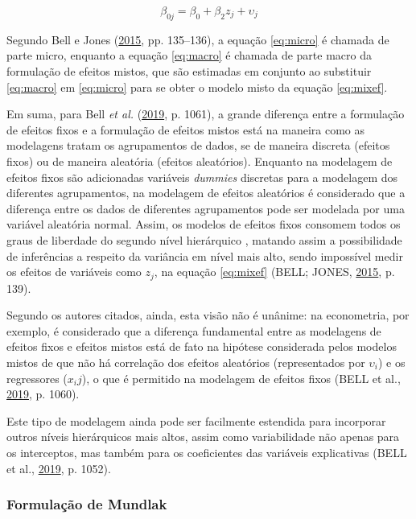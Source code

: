 \documentclass[
  a4paper, 12pt]{article}
\begin{document}
\begin{equation} \label{eq:macro}
\beta_{0j} = \beta_0 + \beta_2 z_{j} + \upsilon_{j} 
\end{equation}

Segundo Bell e Jones (\protect\hyperlink{ref-bell2015}{2015}, pp.
135--136), a equação \ref{eq:micro} é chamada de parte micro, enquanto a
equação \ref{eq:macro} é chamada de parte macro da formulação de efeitos
mistos, que são estimadas em conjunto ao substituir \ref{eq:macro} em
\ref{eq:micro} para se obter o modelo misto da equação \ref{eq:mixef}.

Em suma, para Bell \emph{et al.}
(\protect\hyperlink{ref-bell2019}{2019}, p. 1061), a grande diferença
entre a formulação de efeitos fixos e a formulação de efeitos mistos
está na maneira como as modelagens tratam os agrupamentos de dados, se
de maneira discreta (efeitos fixos) ou de maneira aleatória (efeitos
aleatórios). Enquanto na modelagem de efeitos fixos são adicionadas
variáveis \emph{dummies} discretas para a modelagem dos diferentes
agrupamentos, na modelagem de efeitos aleatórios é considerado que a
diferença entre os dados de diferentes agrupamentos pode ser modelada
por uma variável aleatória normal. Assim, os modelos de efeitos fixos
consomem todos os graus de liberdade do segundo nível hierárquico ,
matando assim a possibilidade de inferências a respeito da variância em
nível mais alto, sendo impossível medir os efeitos de variáveis como
\(z_j\), na equação \ref{eq:mixef} (BELL; JONES,
\protect\hyperlink{ref-bell2015}{2015}, p. 139).

Segundo os autores citados, ainda, esta visão não é unânime: na
econometria, por exemplo, é considerado que a diferença fundamental
entre as modelagens de efeitos fixos e efeitos mistos está de fato na
hipótese considerada pelos modelos mistos de que não há correlação dos
efeitos aleatórios (representados por \(\upsilon_i\)) e os regressores
(\(x_ij\)), o que é permitido na modelagem de efeitos fixos (BELL et
al., \protect\hyperlink{ref-bell2019}{2019}, p. 1060).

Este tipo de modelagem ainda pode ser facilmente estendida para
incorporar outros níveis hierárquicos mais altos, assim como
variabilidade não apenas para os interceptos, mas também para os
coeficientes das variáveis explicativas (BELL et al.,
\protect\hyperlink{ref-bell2019}{2019}, p. 1052).

\hypertarget{formulauxe7uxe3o-de-mundlak}{%
\subsubsection{Formulação de
Mundlak}\label{formulauxe7uxe3o-de-mundlak}}
\end{document}

